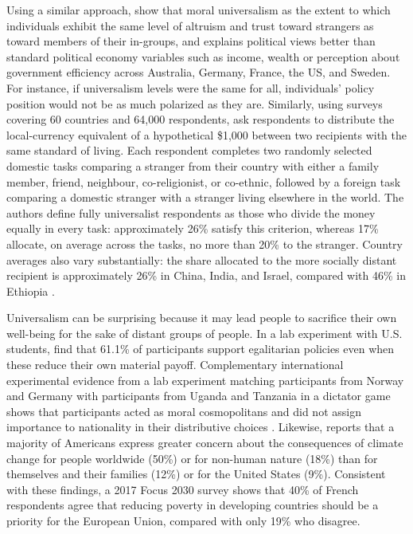 \documentclass[11pt,a4paper]{article}
\begin{document}
Using a similar approach, \citet{enke_moral_2023} show that moral universalism as the extent to which individuals exhibit the same level of altruism and trust toward strangers as toward members of their in-groups, and explains political views better than standard political economy variables such as income, wealth or perception about government efficiency across Australia, Germany, France, the US, and Sweden. For instance, if universalism levels were the same for all, individuals' policy position would not be as much polarized as they are. 
Similarly, using surveys covering 60 countries and 64,000 respondents, \citet{cappelen_universalism_2025} ask respondents to distribute the local-currency equivalent of a hypothetical \$1,000 between two recipients with the same standard of living. Each respondent completes two randomly selected domestic tasks comparing a stranger from their country with either a family member, friend, neighbour, co-religionist, or co-ethnic, followed by a foreign task comparing a domestic stranger with a stranger living elsewhere in the world. The authors define fully universalist respondents as those who divide the money equally in every task: approximately 26\% satisfy this criterion, whereas 17\% allocate, on average across the tasks, no more than 20\% to the stranger. Country averages also vary substantially: the share allocated to the more socially distant recipient is approximately 26\% in China, India, and Israel, compared with 46\% in Ethiopia \citep[Figures 3--5]{cappelen_universalism_2025}.

Universalism can be surprising because it may lead people to sacrifice their own well-being for the sake of distant groups of people. In a lab experiment with U.S. students, \citet{cherry_2017} find that 61.1\% of participants support egalitarian policies even when these reduce their own material payoff. Complementary international experimental evidence from a lab experiment matching participants from Norway and Germany with participants from Uganda and Tanzania in a dictator game shows that participants acted as moral cosmopolitans and did not assign importance to nationality in their distributive choices \citep{cappelen_needs_2013}. Likewise, \citet{leiserowitz_2006} reports that a majority of Americans express greater concern about the consequences of climate change for people worldwide (50\%) or for non-human nature (18\%) than for themselves and their families (12\%) or for the United States (9\%). Consistent with these findings, a 2017 Focus 2030 survey shows that 40\% of French respondents agree that reducing poverty in developing countries should be a priority for the European Union, compared with only 19\% who disagree.
\end{document}
